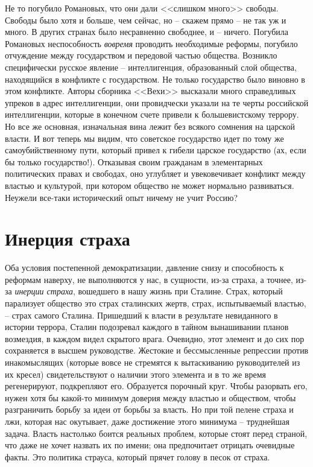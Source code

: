 \documentclass{book}
\begin{document}
Не то погубило Романовых, что они дали <<слишком много>> свободы. Свободы было хотя и больше, чем сейчас, но -- ска­жем прямо -- не так уж и много. В других странах было не­сравненно свободнее, и -- ничего. Погубила Романовых неспо­собность \textit{вовремя}  проводить необходимые реформы, погуби­ло отчуждение между государством и передовой частью обще­ства. Возникло специфически русское явление -- интеллиген­ция, образованный слой общества, находящийся в конфликте с государством. Не только государство было виновно в этом конфликте. Авторы сборника <<Вехи>> высказали много спра­ведливых упреков в адрес интеллигенции, они провидчески указали на те черты российской интеллигенции, которые в ко­нечном счете привели к большевистскому террору. Но все же основная, изначальная вина лежит без всякого сомнения на царской власти. И вот теперь мы видим, что советское государство идет по тому же самоубийственному пути, который привел к гибели царское государство (ах, если бы только государство!). Отказывая своим гражданам в элементарных политических правах и свободах, оно углубляет и увековечивает конфликт между властью и культурой, при котором общество не может нормально развиваться. Неужели все-таки исторический опыт ничему не учит Россию?



\section{Инерция страха}

Оба условия постепенной демократизации, давление снизу и способность к реформам наверху, не выполняются у нас, в сущности, из-за страха, а точнее, из-за \textit{инерции страха},  вошедшего в нашу жизнь при Сталине. Страх, который парализует общество это страх сталинских жертв, страх, испытываемый властью, -- страх самого Сталина. Пришедший к власти в результате невиданного в истории террора, Сталин подозревал каждого в тайном вынашивании планов возмездия, в каждом видел скрытого врага. Очевидно, этот элемент и до сих пор сохраняется в высшем руководстве. Жестокие и бессмысленные репрессии против инакомыслящих (которые вовсе не стремятся к вытаскиванию руководителей из их кресел) свидетельствуют о наличии этого элемента и в то же время регенерируют, подкрепляют его. Образуется порочный круг. Чтобы разорвать его, нужен хотя бы какой-то минимум доверия между властью и обществом, чтобы разграничить борьбу за идеи от борьбы за власть. Но при той пелене страха и лжи, которая нас окутывает, даже достижение этого минимума -- 
труднейшая задача. Власть настолько боится реальных проблем, которые стоят перед страной, что даже не хочет назвать их по имени; она предпочитает отрицать очевидные факты. Это политика страуса, который прячет голову в песок от страха.
\end{document}
